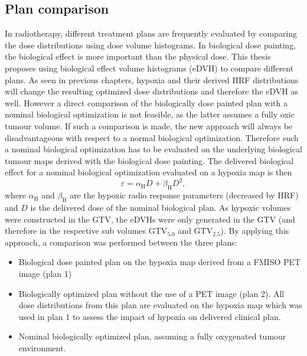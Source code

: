 \subsection{Plan comparison}\label{chap:plancomparison}
In radiotherapy, different treatment plans are frequently evaluated by comparing the dose distributions using dose volume histograms. In biological dose painting, the biological effect is more important than the physical dose. This thesis proposes using biological effect volume histograms (eDVH) to compare different plans. As seen in previous chapters, hypoxia and their derived HRF distributions will change the resulting optimized dose distributions and therefore the eDVH as well. However a direct comparison of the biologically dose painted plan with a nominal biological optimization is not feasible, as the latter assumes a fully oxic tumour volume. If such a comparison is made, the new approach will always be disadvantageous with respect to a normal biological optimization. Therefore such a nominal biological optimization has to be evaluated on the underlying biological tumour maps derived with the biological dose painting. The delivered biological effect for a nominal biological optimization evaluated on a hypoxia map is then
\begin{equation}
\varepsilon = \alpha_\mathrm{H} D + \beta_\mathrm{H}D^2,
\end{equation}
where $\alpha_\mathrm{H}$ and $\beta_\mathrm{H}$ are the hypoxic radio response parameters (decreased by HRF) and $D$ is the delivered dose of the nominal biological plan. As hypoxic volumes were constructed in the GTV, the eDVHs were only generated in the GTV (and therefore in the respective sub volumes GTV$_\mathrm{5.0}$ and GTV$_\mathrm{2.5}$). By applying this approach, a comparison was performed between the three plans:
\begin{itemize}
\item Biological dose painted plan on the hypoxia map derived from a FMISO PET image (plan 1)
\item Biologically optimized plan without the use of a PET image (plan 2). All dose distributions from this plan are evaluated on the hypoxia map which was used in plan 1 to assess the impact of hypoxia on delivered clinical plan.
\item Nominal biologically optimized plan, assuming a fully oxygenated tumour environment.
\end{itemize}